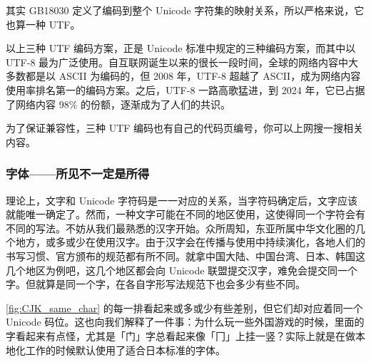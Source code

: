\begin{note}
  其实 GB18030 定义了编码到整个 Unicode 字符集的映射关系，所以严格来说，它也算一种 UTF。
\end{note}

以上三种 UTF 编码方案，正是 Unicode 标准中规定的三种编码方案，而其中以 UTF-8 最为广泛使用。自互联网诞生以来的很长一段时间，全球的网络内容中大多数都是以 ASCII 为编码的，但 2008 年，UTF-8 超越了 ASCII，成为网络内容使用率排名第一的编码方案。之后，UTF-8 一路高歌猛进，到 2024 年，它已占据了网络内容 98\% 的份额，逐渐成为了人们的共识。

\begin{note}
  为了保证兼容性，三种 UTF 编码也有自己的代码页编号，你可以上网搜一搜相关内容。
\end{note}

\subsubsection{字体——所见不一定是所得}\label{sec:font}

理论上，文字和 Unicode 字符码是一一对应的关系，当字符码确定后，文字应该就能唯一确定了。然而，一种文字可能在不同的地区使用，这使得同一个字符会有不同的写法。不妨从我们最熟悉的汉字开始。众所周知，东亚所属中华文化圈的几个地方，或多或少在使用汉字。由于汉字会在传播与使用中持续演化，各地人们的书写习惯、官方颁布的规范都有所不同。就拿中国大陆、中国台湾、日本、韩国这几个地区为例吧，这几个地区都会向 Unicode 联盟提交汉字，难免会提交同一个字。但就算是同一个字，在各自字形写法规范下也会多少有些不同。

\autoref{fig:CJK_same_char} 的每一排看起来或多或少有些差别，但它们却对应着同一个 Unicode 码位。这也向我们解释了一件事：为什么玩一些外国游戏的时候，里面的字看起来有点怪，尤其是「门」字总看起来像「冂」上挂一竖？实际上就是在做本地化工作的时候默认使用了适合日本标准的字体。

